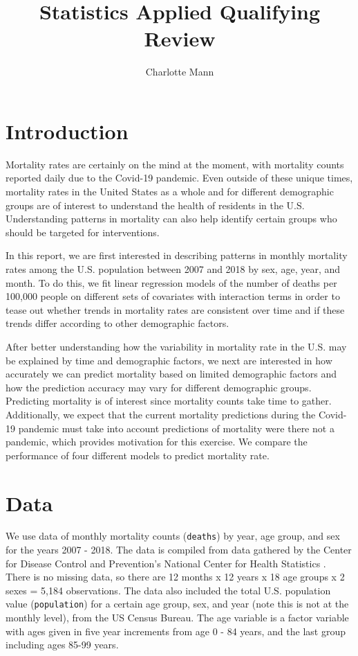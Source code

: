 \documentclass[letterpaper, 11pt]{article}
\title{\Large{\textbf{Statistics Applied Qualifying Review}}}
\author{Charlotte Mann}
\begin{document}
\setcounter{page}{1}

\pagestyle{fancy}
\fancyhead{}
\fancyhead[R]{\slshape \leftmark}

\maketitle
\onehalfspacing

\section{Introduction}

Mortality rates are certainly on the mind at the moment, with mortality counts reported daily due to the Covid-19 pandemic. Even outside of these unique times, mortality rates in the United States as a whole and for different demographic groups are of interest to understand the health of residents in the U.S. Understanding patterns in mortality can also help identify certain groups who should be targeted for interventions.

In this report, we are first interested in describing patterns in monthly mortality rates among the U.S. population between 2007 and 2018 by sex, age, year, and month. To do this, we fit linear regression models of the number of deaths per 100,000 people on different sets of covariates with interaction terms in order to tease out whether trends in mortality rates are consistent over time and if these trends differ according to other demographic factors.

After better understanding how the variability in mortality rate in the U.S. may be explained by time and demographic factors, we next are interested in how accurately we can predict mortality based on limited demographic factors and how the prediction accuracy may vary for different demographic groups. Predicting mortality is of interest since mortality counts take time to gather. Additionally, we expect that the current mortality predictions during the Covid-19 pandemic must take into account predictions of mortality were there not a pandemic, which provides motivation for this exercise. We compare the performance of four different models to predict mortality rate.


\section{Data}

We use data of monthly mortality counts (\texttt{deaths}) by year, age group, and sex for the years 2007 - 2018. The data is compiled from data gathered by the Center for Disease Control and Prevention's National Center for Health Statistics \cite{cdc_mort}. There is no missing data, so there are 12 months x 12 years x 18 age groups x 2 sexes = 5,184 observations. The data also included the total U.S. population value (\texttt{population}) for a certain age group, sex, and year (note this is not at the monthly level), from the US Census Bureau. The age variable is a factor variable with ages given in five year increments from age 0 - 84 years, and the last group including ages 85-99 years.
\end{document}
